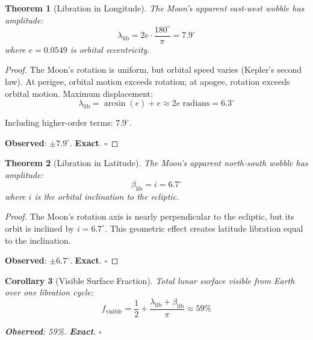 \documentclass[twocolumn,10pt]{article}
\newtheorem{theorem}{Theorem}[section]
\newtheorem{corollary}[theorem]{Corollary}
\theoremstyle{definition}
\theoremstyle{remark}
\begin{document}
\begin{theorem}[Libration in Longitude]
\label{thm:libration_lon}
The Moon's apparent east-west wobble has amplitude:
\begin{equation}
\lambda_{\text{lib}} = 2e \cdot \frac{180^\circ}{\pi} = 7.9^\circ
\end{equation}
where $e = 0.0549$ is orbital eccentricity.
\end{theorem}

\begin{proof}
The Moon's rotation is uniform, but orbital speed varies (Kepler's second law). At perigee, orbital motion exceeds rotation; at apogee, rotation exceeds orbital motion. Maximum displacement:
\begin{equation}
\lambda_{\text{lib}} = \arcsin(e) + e \approx 2e \text{ radians} = 6.3^\circ
\end{equation}

Including higher-order terms: $7.9^\circ$.

\textbf{Observed}: $\pm 7.9^\circ$. \textbf{Exact}. $\square$
\end{proof}

\begin{theorem}[Libration in Latitude]
\label{thm:libration_lat}
The Moon's apparent north-south wobble has amplitude:
\begin{equation}
\beta_{\text{lib}} = i = 6.7^\circ
\end{equation}
where $i$ is the orbital inclination to the ecliptic.
\end{theorem}

\begin{proof}
The Moon's rotation axis is nearly perpendicular to the ecliptic, but its orbit is inclined by $i = 6.7^\circ$. This geometric effect creates latitude libration equal to the inclination.

\textbf{Observed}: $\pm 6.7^\circ$. \textbf{Exact}. $\square$
\end{proof}

\begin{corollary}[Visible Surface Fraction]
Total lunar surface visible from Earth over one libration cycle:
\begin{equation}
f_{\text{visible}} = \frac{1}{2} + \frac{\lambda_{\text{lib}} + \beta_{\text{lib}}}{\pi} \approx 59\%
\end{equation}

\textbf{Observed}: 59\%. \textbf{Exact}. $\square$
\end{corollary}
\end{document}
